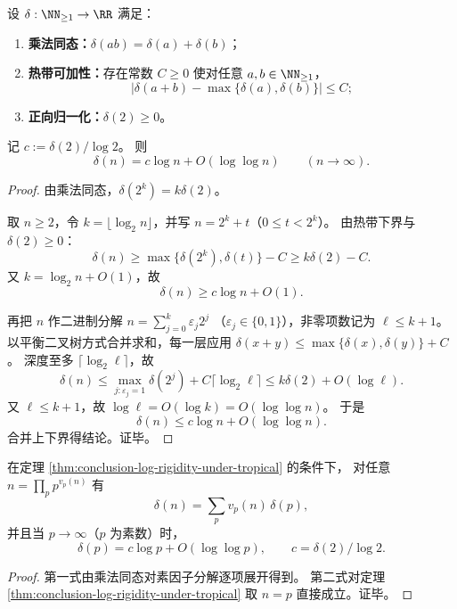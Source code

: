 \begin{theorem}[乘法同态与热带可加性的对数刚性]\label{thm:conclusion-log-rigidity-under-tropical}
设 \(\delta:\NN_{\ge 1}\to\RR\) 满足：
\begin{enumerate}
  \item \textbf{乘法同态：}\(\delta(ab)=\delta(a)+\delta(b)\)；
  \item \textbf{热带可加性：}存在常数 \(C\ge 0\) 使对任意 \(a,b\in\NN_{\ge 1}\)，
  \[
  \bigl|\delta(a+b)-\max\{\delta(a),\delta(b)\}\bigr|\le C;
  \]
  \item \textbf{正向归一化：}\(\delta(2)\ge 0\)。
\end{enumerate}
记 \(c:=\delta(2)/\log 2\)。
则
\[
\delta(n)=c\log n+O(\log\log n)\qquad(n\to\infty).
\]
\end{theorem}
\begin{proof}
由乘法同态，\(\delta(2^k)=k\delta(2)\)。

取 \(n\ge 2\)，令 \(k=\lfloor\log_2 n\rfloor\)，并写 \(n=2^k+t\)（\(0\le t<2^k\)）。
由热带下界与 \(\delta(2)\ge 0\)：
\[
\delta(n)\ge \max\{\delta(2^k),\delta(t)\}-C\ge k\delta(2)-C.
\]
又 \(k=\log_2 n+O(1)\)，故
\[
\delta(n)\ge c\log n+O(1).
\]

再把 \(n\) 作二进制分解
\(
n=\sum_{j=0}^{k}\varepsilon_j2^j
\)
（\(\varepsilon_j\in\{0,1\}\)），非零项数记为 \(\ell\le k+1\)。
以平衡二叉树方式合并求和，每一层应用
\(
\delta(x+y)\le \max\{\delta(x),\delta(y)\}+C
\)。
深度至多 \(\lceil\log_2\ell\rceil\)，故
\[
\delta(n)\le \max_{j:\varepsilon_j=1}\delta(2^j)+C\lceil\log_2\ell\rceil
\le k\delta(2)+O(\log\ell).
\]
又 \(\ell\le k+1\)，故 \(\log\ell=O(\log k)=O(\log\log n)\)。
于是
\[
\delta(n)\le c\log n+O(\log\log n).
\]
合并上下界得结论。证毕。
\end{proof}

\begin{corollary}[素数权重的渐近对数律]\label{cor:conclusion-prime-weight-log-law}
在定理 \ref{thm:conclusion-log-rigidity-under-tropical} 的条件下，
对任意 \(n=\prod_p p^{v_p(n)}\) 有
\[
\delta(n)=\sum_{p}v_p(n)\,\delta(p),
\]
并且当 \(p\to\infty\)（\(p\) 为素数）时，
\[
\delta(p)=c\log p+O(\log\log p),\qquad c=\delta(2)/\log 2.
\]
\end{corollary}
\begin{proof}
第一式由乘法同态对素因子分解逐项展开得到。
第二式对定理 \ref{thm:conclusion-log-rigidity-under-tropical} 取 \(n=p\) 直接成立。证毕。
\end{proof}


